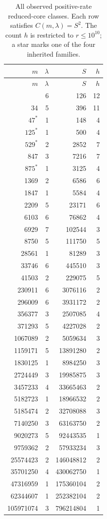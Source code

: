 \documentclass[11pt]{article}
\theoremstyle{definition}
\theoremstyle{remark}
\begin{document}
\begin{longtable}{rrrr}
\caption{All observed positive-rate reduced-core classes. Each row
satisfies $C(m,\lambda)=S^{2}$. The count $h$ is restricted to
$r\leq10^{10}$; a star marks one of the four inherited families.}
\label{tab:cores}\\
\toprule
$m$&$\lambda$&$S$&$h$\\
\midrule
\endfirsthead
\toprule
$m$&$\lambda$&$S$&$h$\\
\midrule
\endhead
\bottomrule
\endfoot
9&6&126&12\\
34&5&396&11\\
$47^{*}$&1&148&4\\
$125^{*}$&1&500&4\\
$529^{*}$&2&2852&7\\
847&3&7216&7\\
$875^{*}$&1&3125&4\\
1369&2&6586&6\\
1847&1&5584&4\\
2209&5&23171&6\\
6103&6&76862&4\\
6929&7&102544&3\\
8750&5&111750&5\\
28561&1&81289&3\\
33746&6&445510&3\\
41503&2&229075&5\\
230911&6&3076116&2\\
296009&6&3931172&2\\
356377&3&2507085&4\\
371293&5&4227028&2\\
1067089&2&5059634&3\\
1159171&5&13891280&2\\
1830125&1&8984250&3\\
2724449&3&19985875&3\\
3457233&4&33665463&2\\
5182723&1&18966532&2\\
5185474&2&32708088&3\\
7140250&3&63163750&2\\
9020273&5&92443535&1\\
9759362&2&57933234&3\\
25574423&2&146048812&2\\
35701250&4&430062750&1\\
47316959&1&175360104&2\\
62344607&1&252382104&2\\
105971074&3&796214804&1\\
\end{longtable}
\end{document}
